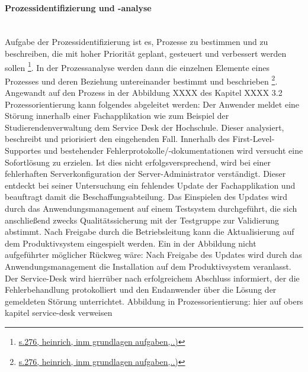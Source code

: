 \documentclass[a4paper, 12pt]{scrreprt}
\begin{document}
\paragraph{Prozessidentifizierung und -analyse}\mbox{}\\
Aufgabe der Prozessidentifizierung ist es, Prozesse zu bestimmen und zu beschreiben, die mit hoher Priorität geplant, gesteuert und verbessert werden sollen \footnote{\url{s.276, heinrich, inm grundlagen aufgaben,..)}}. In der Prozessanalyse werden dann die einzelnen Elemente eines Prozesses und deren Beziehung untereinander bestimmt und beschrieben \footnote{\url{s.276, heinrich, inm grundlagen aufgaben,..)}}.
Angewandt auf den Prozess in der Abbildung XXXX des Kapitel XXXX 3.2 Prozessorientierung kann folgendes abgeleitet werden:
Der Anwender meldet eine Störung innerhalb einer Fachapplikation wie zum Beispiel der Studierendenverwaltung dem Service Desk der Hochschule. Dieser analysiert, beschreibt und priorisiert den eingehenden Fall. Innerhalb des First-Level-Supportes und bestehender Fehlerprotokolle/-dokumentationen wird versucht eine Sofortlösung zu erzielen. Ist dies nicht erfolgsversprechend, wird bei einer fehlerhaften Serverkonfiguration der Server-Administrator verständigt. Dieser entdeckt bei seiner Untersuchung ein fehlendes Update der Fachapplikation und beauftragt damit die Beschaffungsabteilung. Das Einspielen des Updates wird durch das Anwendungsmanagement auf einem Testsystem durchgeführt, die sich anschließend zwecks Qualitätssicherung mit der Testgruppe zur Validierung abstimmt. Nach Freigabe durch die Betriebsleitung kann die Aktualisierung auf dem Produktivsystem eingespielt werden.
Ein in der Abbildung nicht aufgeführter möglicher Rückweg wäre: Nach Freigabe des Updates wird durch das Anwendungsmanagement die Installation auf dem Produktivsystem veranlasst. Der Service-Desk wird hierrüber nach erfolgreichem Abschluss informiert, der die Fehlerbehandlung protokolliert und den Endanwender über die Lösung der gemeldeten Störung unterrichtet. 
Abbildung in Prozessorientierung: hier auf obers kapitel service-desk verweisen
\end{document}
